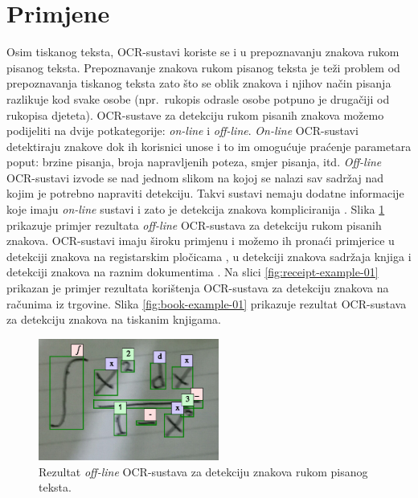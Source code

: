 \documentclass[times, utf8, zavrsni]{fer}
\begin{document}
\section{Primjene}
Osim tiskanog teksta, OCR-sustavi koriste se i u prepoznavanju znakova rukom
pisanog teksta. Prepoznavanje znakova rukom pisanog teksta je teži problem od
prepoznavanja tiskanog teksta \citep{DBLP:journals/corr/abs-1710-05703} zato što
se oblik znakova i njihov način pisanja razlikuje kod svake osobe (npr.\
rukopis odrasle osobe potpuno je drugačiji od rukopisa djeteta).
OCR-sustave za detekciju rukom pisanih znakova možemo podijeliti na dvije
potkategorije: \emph{on-line} i \emph{off-line}. \emph{On-line} OCR-sustavi
detektiraju znakove dok ih korisnici unose i to im omogućuje praćenje
parametara poput: brzine pisanja, broja napravljenih poteza,
smjer pisanja, itd. \emph{Off-line} OCR-sustavi izvode se nad jednom slikom na
kojoj se nalazi sav sadržaj nad kojim je potrebno napraviti detekciju. Takvi
sustavi nemaju dodatne informacije koje imaju \emph{on-line} sustavi i zato je
detekcija znakova kompliciranija \citep{DBLP:journals/corr/abs-1710-05703}.
Slika \ref{fig:math-example-01} prikazuje primjer rezultata \emph{off-line}
OCR-sustava za detekciju rukom pisanih znakova. OCR-sustavi imaju široku
primjenu i možemo ih pronaći primjerice u detekciji znakova na registarskim
pločicama
\citep{DBLP:journals/corr/Saghaei16a,DBLP:journals/corr/abs-1802-09567}, u
detekciji znakova sadržaja knjiga
\citep{DBLP:journals/corr/abs-1802-10033,Christy:2017:MDE:3172938.3075645} i
detekciji znakova na raznim dokumentima
\citep{DBLP:journals/corr/HarrajR15,verma2016ocr}. Na slici
\ref{fig:receipt-example-01} prikazan je primjer rezultata korištenja
OCR-sustava za detekciju znakova na računima iz trgovine. Slika
\ref{fig:book-example-01} prikazuje rezultat OCR-sustava za detekciju znakova
na tiskanim knjigama.

\pagebreak

\begin{figure}[htb]
    \centering
    \captionsetup{justification=centering,margin=2cm}
    \includegraphics[height=4cm]{images/math-example-01.png}
    \caption{
        Rezultat \emph{off-line} OCR-sustava za detekciju znakova rukom pisanog
        teksta.
    }
    \label{fig:math-example-01}
\end{figure}
\end{document}
